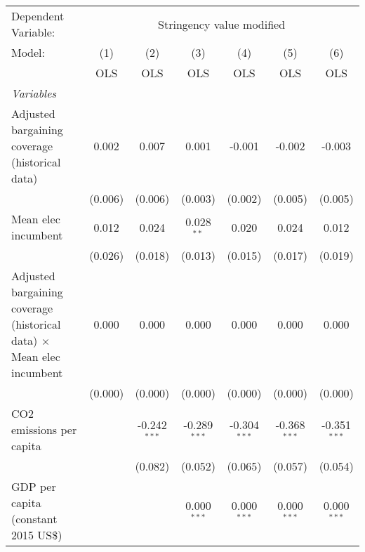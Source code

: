
\begingroup
\centering
\begin{tabular}{lcccccc}
   \toprule
   Dependent Variable: & \multicolumn{6}{c}{Stringency value modified}\\
   Model:                                                                       & (1)     & (2)            & (3)            & (4)            & (5)            & (6)\\  
                                                                                &  OLS    & OLS            & OLS            & OLS            & OLS            & OLS\\  
   \midrule
   \emph{Variables}\\
   Adjusted bargaining coverage (historical data)                               & 0.002   & 0.007          & 0.001          & -0.001         & -0.002         & -0.003\\   
                                                                                & (0.006) & (0.006)        & (0.003)        & (0.002)        & (0.005)        & (0.005)\\   
   Mean elec incumbent                                                          & 0.012   & 0.024          & 0.028$^{**}$   & 0.020          & 0.024          & 0.012\\   
                                                                                & (0.026) & (0.018)        & (0.013)        & (0.015)        & (0.017)        & (0.019)\\   
   Adjusted bargaining coverage (historical data) $\times$ Mean elec incumbent  & 0.000   & 0.000          & 0.000          & 0.000          & 0.000          & 0.000\\   
                                                                                & (0.000) & (0.000)        & (0.000)        & (0.000)        & (0.000)        & (0.000)\\   
   CO2 emissions per capita                                                     &         & -0.242$^{***}$ & -0.289$^{***}$ & -0.304$^{***}$ & -0.368$^{***}$ & -0.351$^{***}$\\   
                                                                                &         & (0.082)        & (0.052)        & (0.065)        & (0.057)        & (0.054)\\   
   GDP per capita (constant 2015 US\$)                                          &         &                & 0.000$^{***}$  & 0.000$^{***}$  & 0.000$^{***}$  & 0.000$^{***}$\\   

\end{tabular}
